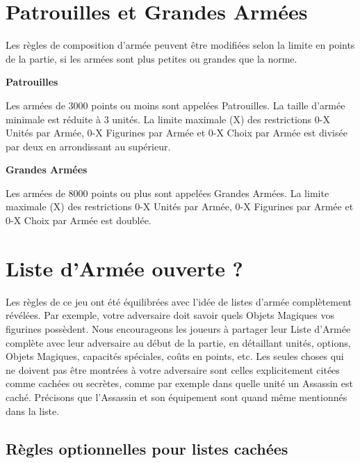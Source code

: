 \section{Patrouilles et Grandes Armées}

Les règles de composition d'armée peuvent être modifiées selon la limite en points de la partie, si les armées sont plus petites ou grandes que la norme.

\begin{multicols}{2}\raggedcolumns

\begin{center}\textbf{Patrouilles}\end{center}

Les armées de 3000 points ou moins sont appelées Patrouilles. La taille d'armée minimale est réduite à 3 unités. La limite maximale (X) des restrictions 0-X Unités par Armée, 0-X Figurines par Armée et 0-X Choix par Armée est divisée par deux en arrondissant au supérieur.

\columnbreak

\begin{center}\textbf{Grandes Armées}\end{center}

Les armées de 8000 points ou plus sont appelées Grandes Armées. La limite maximale (X) des restrictions 0-X Unités par Armée, 0-X Figurines par Armée et 0-X Choix par Armée est doublée.

\end{multicols}

\newpage
\section{Liste d'Armée ouverte ?}

Les règles de ce jeu ont été équilibrées avec l'idée de listes d'armée complètement révélées. Par exemple, votre adversaire doit savoir quels Objets Magiques vos figurines possèdent. Nous encourageons les joueurs à partager leur Liste d'Armée complète avec leur adversaire au début de la partie, en détaillant unités, options, Objets Magiques, capacités spéciales, coûts en points, etc. Les seules choses qui ne doivent pas être montrées à votre adversaire sont celles explicitement citées comme cachées ou secrètes, comme par exemple dans quelle unité un Assassin est caché. Précisons que l'Assassin et son équipement sont quand même mentionnés dans la liste.

\subsection{Règles optionnelles pour listes cachées}
\label{hidden_lists}

